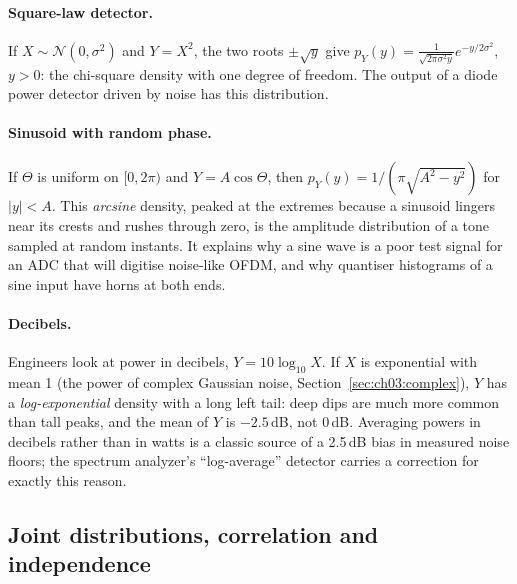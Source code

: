 
\paragraph{Square-law detector.} If $X\sim\mathcal N(0,\sigma^2)$ and $Y=X^2$, the two roots
$\pm\sqrt y$ give $p_Y(y)=\frac{1}{\sqrt{2\pi\sigma^2 y}}e^{-y/2\sigma^2}$, $y>0$: the chi-square
density with one degree of freedom. The output of a diode power detector driven by noise has
this distribution.

\paragraph{Sinusoid with random phase.} If $\Theta$ is uniform on $[0,2\pi)$ and
$Y=A\cos\Theta$, then $p_Y(y)=1/(\pi\sqrt{A^2-y^2})$ for $|y|<A$. This \emph{arcsine} density,
peaked at the extremes because a sinusoid lingers near its crests and rushes through zero, is the
amplitude distribution of a tone sampled at random instants. It explains why a sine wave is a poor
test signal for an ADC that will digitise noise-like OFDM, and why quantiser histograms of a sine
input have horns at both ends.

\paragraph{Decibels.} Engineers look at power in decibels, $Y=10\log_{10}X$. If $X$ is
exponential with mean 1 (the power of complex Gaussian noise, Section~\ref{sec:ch03:complex}), $Y$
has a \emph{log-exponential} density with a long left tail: deep dips are much more common than
tall peaks, and the mean of $Y$ is $-2.5$\,dB, not 0\,dB. Averaging powers in decibels rather than
in watts is a classic source of a 2.5\,dB bias in measured noise floors; the spectrum analyzer's
``log-average'' detector carries a correction for exactly this reason.

\subsection{Joint distributions, correlation and independence}

